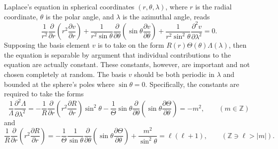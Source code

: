 \documentclass[11pt,dvipsnames]{thesis}
\begin{document}
Laplace's equation in spherical coordinates $(r, \theta, \lambda)$, where $r$ is the radial coordinate, $\theta$ is the polar angle, and $\lambda$ is the azimuthal angle, reads
\begin{equation}
\frac{1}{r^2}\frac{\partial}{\partial r}\left(r^2 \frac{\partial v}{\partial r}\right) + \frac{1}{r^2 \sin\theta} \frac{\partial}{\partial \theta} \left(\sin\theta \frac{\partial v}{\partial \theta}\right) + \frac{1}{r^2 \sin^2\theta} \frac{\partial^2 v}{\partial \lambda^2} = 0. \label{eq:LaplacesEqInSphericalCoords}
\end{equation}
Supposing the basis element $v$ is to take on the form $R(r)\Theta(\theta)\Lambda(\lambda)$, then the equation is separable by argument that individual contributions to the equation are actually constant. These constants, however, are important and not chosen completely at random. The basis $v$ should be both periodic in $\lambda$ and bounded at the sphere's poles where $\sin\theta = 0$. Specifically, the constants are required to take the forms
\begin{equation}
\frac{1}{\Lambda}\frac{\partial^2 \Lambda}{\partial \lambda^2} = -\frac{1}{R}\frac{\partial}{\partial r} \left(r^2 \frac{\partial R}{\partial r}\right) \sin^2\theta - \frac{1}{\Theta} \sin\theta \frac{\partial}{\partial \theta} \left(\sin\theta \frac{\partial \Theta}{\partial \theta}\right) = -m^2, \qquad (m \in \mathbb{Z})
\end{equation}
and
\begin{equation}
\frac{1}{R}\frac{\partial}{\partial r} \left(r^2 \frac{\partial R}{\partial r}\right) = -\frac{1}{\Theta}\frac{1}{\sin\theta} \frac{\partial}{\partial \theta} \left(\sin\theta \frac{\partial \Theta}{\partial \theta}\right) + \frac{m^2}{\sin^2\theta} = \ell(\ell + 1), \qquad (\mathbb{Z} \ni \ell > |m|).
\end{equation}
\end{document}
